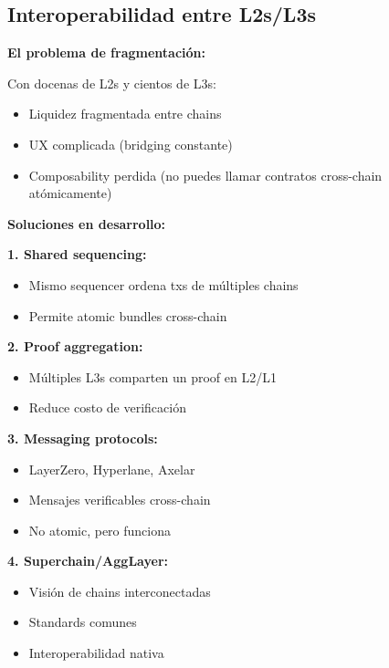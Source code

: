 \documentclass[11pt,a4paper,twoside,openright]{book}
\theoremstyle{definition}
\theoremstyle{plain}
\theoremstyle{remark}
\begin{document}
\subsection{Interoperabilidad entre L2s/L3s}

\begin{advertencia}
\textbf{El problema de fragmentación:}

Con docenas de L2s y cientos de L3s:
\begin{itemize}
    \item Liquidez fragmentada entre chains
    \item UX complicada (bridging constante)
    \item Composability perdida (no puedes llamar contratos cross-chain atómicamente)
\end{itemize}

\textbf{Soluciones en desarrollo:}

\textbf{1. Shared sequencing:}
\begin{itemize}
    \item Mismo sequencer ordena txs de múltiples chains
    \item Permite atomic bundles cross-chain
\end{itemize}

\textbf{2. Proof aggregation:}
\begin{itemize}
    \item Múltiples L3s comparten un proof en L2/L1
    \item Reduce costo de verificación
\end{itemize}

\textbf{3. Messaging protocols:}
\begin{itemize}
    \item LayerZero, Hyperlane, Axelar
    \item Mensajes verificables cross-chain
    \item No atomic, pero funciona
\end{itemize}

\textbf{4. Superchain/AggLayer:}
\begin{itemize}
    \item Visión de chains interconectadas
    \item Standards comunes
    \item Interoperabilidad nativa
\end{itemize}
\end{advertencia}

\end{document}
